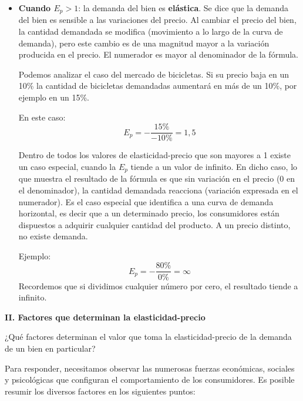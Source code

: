 \documentclass[12pt,a4paper]{article}
\begin{document}
\begin{itemize}
    \item \textbf{Cuando $E_p > 1$}: la demanda del bien es \textbf{elástica}. Se dice que la demanda del bien es sensible a las variaciones del precio. Al cambiar el precio del bien, la cantidad demandada se modifica (movimiento a lo largo de la curva de demanda), pero este cambio es de una magnitud mayor a la variación producida en el precio. El numerador es mayor al denominador de la fórmula.
    
    Podemos analizar el caso del mercado de bicicletas. Si su precio baja en un 10\% la cantidad de bicicletas demandadas aumentará en más de un 10\%, por ejemplo en un 15\%.
    
    En este caso:
    \[
    E_p = -\frac{15\%}{-10\%} = 1,5
    \]
    
    Dentro de todos los valores de elasticidad-precio que son mayores a 1 existe un caso especial, cuando la $E_p$ tiende a un valor de infinito. En dicho caso, lo que muestra el resultado de la fórmula es que sin variación en el precio (0 en el denominador), la cantidad demandada reacciona (variación expresada en el numerador). Es el caso especial que identifica a una curva de demanda horizontal, es decir que a un determinado precio, los consumidores están dispuestos a adquirir cualquier cantidad del producto. A un precio distinto, no existe demanda.
    
    Ejemplo:
    \[
    E_p = -\frac{80\%}{0\%} = \infty
    \]
    Recordemos que si dividimos cualquier número por cero, el resultado tiende a infinito.
\end{itemize}

\textbf{II. Factores que determinan la elasticidad-precio}

¿Qué factores determinan el valor que toma la elasticidad-precio de la demanda de un bien en particular?

Para responder, necesitamos observar las numerosas fuerzas económicas, sociales y psicológicas que configuran el comportamiento de los consumidores. Es posible resumir los diversos factores en los siguientes puntos:
\end{document}
